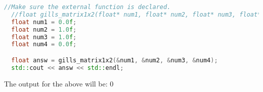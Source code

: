 \documentclass{article}
\begin{document}
\begin{lstlisting}[language=C++, frame=single]
  //Make sure the external function is declared.
  //float gills_matrix1x2(float* num1, float* num2, float* num3, float* num4);
  float num1 = 0.0f;
  float num2 = 1.0f;
  float num3 = 1.0f;
  float num4 = 0.0f;

  float answ = gills_matrix1x2(&num1, &num2, &num3, &num4);
  std::cout << answ << std::endl;
\end{lstlisting}

\noindent The output for the above will be: $0$ \\
\end{document}
